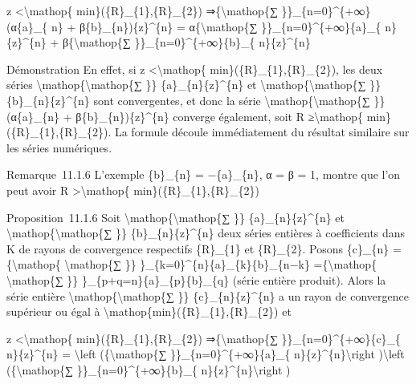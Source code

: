 \documentclass[]{article}
\begin{document}
\textbar{}z\textbar{} \textless{}\textbackslash{}mathop\{
min\}(\{R\}\_\{1\},\{R\}\_\{2\}) ⇒\{\textbackslash{}mathop\{∑
\}\}\_\{n=0\}\^{}\{+∞\}(α\{a\}\_\{ n\} + β\{b\}\_\{n\})\{z\}\^{}\{n\} =
α\{\textbackslash{}mathop\{∑ \}\}\_\{n=0\}\^{}\{+∞\}\{a\}\_\{
n\}\{z\}\^{}\{n\} + β\{\textbackslash{}mathop\{∑
\}\}\_\{n=0\}\^{}\{+∞\}\{b\}\_\{ n\}\{z\}\^{}\{n\}

Démonstration En effet, si \textbar{}z\textbar{}
\textless{}\textbackslash{}mathop\{ min\}(\{R\}\_\{1\},\{R\}\_\{2\}),
les deux séries \textbackslash{}mathop\{\textbackslash{}mathop\{∑ \}\}
\{a\}\_\{n\}\{z\}\^{}\{n\} et
\textbackslash{}mathop\{\textbackslash{}mathop\{∑ \}\}
\{b\}\_\{n\}\{z\}\^{}\{n\} sont convergentes, et donc la série
\textbackslash{}mathop\{\textbackslash{}mathop\{∑ \}\} (α\{a\}\_\{n\} +
β\{b\}\_\{n\})\{z\}\^{}\{n\} converge également, soit R
≥\textbackslash{}mathop\{ min\}(\{R\}\_\{1\},\{R\}\_\{2\}). La formule
découle immédiatement du résultat similaire sur les séries numériques.

Remarque~11.1.6 L'exemple \{b\}\_\{n\} = −\{a\}\_\{n\}, α = β = 1,
montre que l'on peut avoir R \textgreater{}\textbackslash{}mathop\{
min\}(\{R\}\_\{1\},\{R\}\_\{2\})

Proposition~11.1.6 Soit
\textbackslash{}mathop\{\textbackslash{}mathop\{∑ \}\}
\{a\}\_\{n\}\{z\}\^{}\{n\} et
\textbackslash{}mathop\{\textbackslash{}mathop\{∑ \}\}
\{b\}\_\{n\}\{z\}\^{}\{n\} deux séries entières à coefficients dans K de
rayons de convergence respectifs \{R\}\_\{1\} et \{R\}\_\{2\}. Posons
\{c\}\_\{n\} =\{\textbackslash{}mathop\{ \textbackslash{}mathop\{∑ \}\}
\}\_\{k=0\}\^{}\{n\}\{a\}\_\{k\}\{b\}\_\{n−k\}
=\{\textbackslash{}mathop\{ \textbackslash{}mathop\{∑ \}\}
\}\_\{p+q=n\}\{a\}\_\{p\}\{b\}\_\{q\} (série entière produit). Alors la
série entière \textbackslash{}mathop\{\textbackslash{}mathop\{∑ \}\}
\{c\}\_\{n\}\{z\}\^{}\{n\} a un rayon de convergence supérieur ou égal à
\textbackslash{}mathop\{min\}(\{R\}\_\{1\},\{R\}\_\{2\}) et

\textbar{}z\textbar{} \textless{}\textbackslash{}mathop\{
min\}(\{R\}\_\{1\},\{R\}\_\{2\}) ⇒\{\textbackslash{}mathop\{∑
\}\}\_\{n=0\}\^{}\{+∞\}\{c\}\_\{ n\}\{z\}\^{}\{n\} =
\textbackslash{}left (\{\textbackslash{}mathop\{∑
\}\}\_\{n=0\}\^{}\{+∞\}\{a\}\_\{ n\}\{z\}\^{}\{n\}\textbackslash{}right
)\textbackslash{}left (\{\textbackslash{}mathop\{∑
\}\}\_\{n=0\}\^{}\{+∞\}\{b\}\_\{ n\}\{z\}\^{}\{n\}\textbackslash{}right
)
\end{document}
